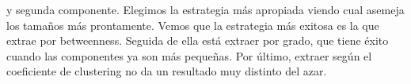 \documentclass{article}
\begin{document}
y segunda componente. Elegimos la estrategia más apropiada viendo cual asemeja los tamaños más prontamente. Vemos que la estrategia más exitosa es la que extrae por betweenness. Seguida de ella está extraer por grado, que tiene éxito cuando las componentes ya son más pequeñas. Por último, extraer según el coeficiente de clustering no da un resultado muy distinto del azar.


\end{document}
